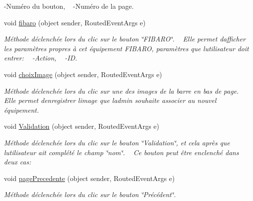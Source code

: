 \begin{DoxyCompactItemize}
\begin{DoxyCompactList}
-\/\+Numéro du bouton, ~\newline
-\/\+Numéro de la page. ~\newline
\end{DoxyCompactList}\item 
void \hyperlink{class_my_domotik_1_1_gestion_equipements_a2606d5e003e6e0682f99184760a32fa8}{fibaro} (object sender, Routed\+Event\+Args e)
\begin{DoxyCompactList}\small\item\em Méthode déclenchée lors du clic sur le bouton \char`\"{}\+F\+I\+B\+A\+R\+O\char`\"{}. ~\newline
Elle permet d\textquotesingle{}afficher les paramètres propres à cet équipement F\+I\+B\+A\+RO, paramètres que l\textquotesingle{}utilisateur doit entrer\+: ~\newline
-\/\+Action, ~\newline
-\/\+ID. ~\newline
\end{DoxyCompactList}\item 
void \hyperlink{class_my_domotik_1_1_gestion_equipements_aec25f63c19c829b20066b09086dca7f4}{choix\+Image} (object sender, Routed\+Event\+Args e)
\begin{DoxyCompactList}\small\item\em Méthode déclenchée lors du clic sur une des images de la barre en bas de page. ~\newline
Elle permet d\textquotesingle{}enregistrer l\textquotesingle{}image que l\textquotesingle{}admin souhaite associer au nouvel équipement. \end{DoxyCompactList}\item 
void \hyperlink{class_my_domotik_1_1_gestion_equipements_ad6cab489fd5f8e39355f93a233f67dec}{Validation} (object sender, Routed\+Event\+Args e)
\begin{DoxyCompactList}\small\item\em Méthode déclenchée lors du clic sur le bouton \char`\"{}\+Validation\char`\"{}, et cela après que l\textquotesingle{}utilisateur ait complété le champ \char`\"{}nom\char`\"{}. ~\newline
Ce bouton peut être enclenché dans deux cas\+: ~\newline
\end{DoxyCompactList}\item 
void \hyperlink{class_my_domotik_1_1_gestion_equipements_a4ea9da2291e18bba9c8484a786d18fa6}{page\+Precedente} (object sender, Routed\+Event\+Args e)
\begin{DoxyCompactList}\small\item\em Méthode déclenchée lors du clic sur le bouton \char`\"{}\+Précédent\char`\"{}. ~\newline

\end{DoxyCompactList}
\end{DoxyCompactItemize}

